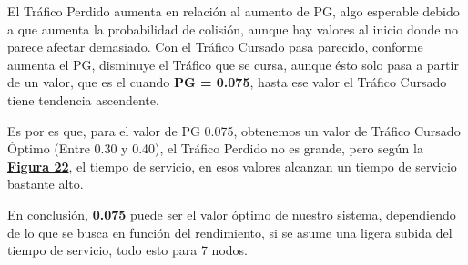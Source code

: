 \documentclass{article}
\begin{document}
\quad

El Tráfico Perdido aumenta en relación al aumento de PG, algo esperable debido a que aumenta la probabilidad de colisión, aunque hay valores al inicio donde no parece afectar demasiado. Con el Tráfico Cursado pasa parecido, conforme aumenta el PG, disminuye el Tráfico que se cursa, aunque ésto solo pasa a partir de un valor, que es el cuando \textbf{PG = 0.075}, hasta ese valor el Tráfico Cursado tiene tendencia ascendente. 

Es por es que, para el valor de PG 0.075, obtenemos un valor de Tráfico Cursado Óptimo (Entre 0.30 y 0.40), el Tráfico Perdido no es grande, pero según la \hyperref[fig:TSvsTC]{\textbf{Figura 22}}, el tiempo de servicio, en esos valores alcanzan un tiempo de servicio bastante alto.

\quad

En conclusión, \textbf{0.075} puede ser el valor óptimo de nuestro sistema, dependiendo de lo que se busca en función del rendimiento, si se asume una ligera subida del tiempo de servicio, todo esto para 7 nodos.
\end{document}
